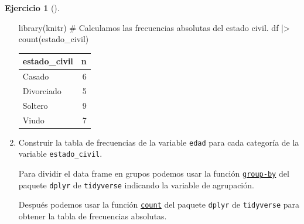 \documentclass[
  spanish,
  a4paper,
]{scrreport}
\newenvironment{Shaded}{\begin{snugshade}}{\end{snugshade}}
\newcommand{\CommentTok}[1]{\textcolor[rgb]{0.37,0.37,0.37}{#1}}
\newcommand{\FunctionTok}[1]{\textcolor[rgb]{0.28,0.35,0.67}{#1}}
\newcommand{\NormalTok}[1]{\textcolor[rgb]{0.00,0.23,0.31}{#1}}
\newcommand{\SpecialCharTok}[1]{\textcolor[rgb]{0.37,0.37,0.37}{#1}}
\theoremstyle{definition}
\newtheorem{exercise}{Ejercicio}[chapter]
\theoremstyle{remark}
\begin{document}
\begin{exercise}[]
\begin{enumerate}
\begin{tcolorbox}
\begin{Shaded}
\begin{Highlighting}[]
\FunctionTok{library}\NormalTok{(knitr)}
\CommentTok{\# Calculamos las frecuencias absolutas del estado civil.}
\NormalTok{df }\SpecialCharTok{|\textgreater{}} \FunctionTok{count}\NormalTok{(estado\_civil)}
\end{Highlighting}
\end{Shaded}

  \begin{longtable}[]{@{}lr@{}}
  \toprule\noalign{}
  estado\_civil & n \\
  \midrule\noalign{}
  \endhead
  \bottomrule\noalign{}
  \endlastfoot
  Casado & 6 \\
  Divorciado & 5 \\
  Soltero & 9 \\
  Viudo & 7 \\
  \end{longtable}

  \end{tcolorbox}
\item
  Construir la tabla de frecuencias de la variable \texttt{edad} para
  cada categoría de la variable \texttt{estado\_civil}.

  \begin{tcolorbox}[enhanced jigsaw, breakable, leftrule=.75mm, toptitle=1mm, rightrule=.15mm, opacitybacktitle=0.6, left=2mm, colframe=quarto-callout-tip-color-frame, titlerule=0mm, toprule=.15mm, opacityback=0, bottomtitle=1mm, coltitle=black, colbacktitle=quarto-callout-tip-color!10!white, title=\textcolor{quarto-callout-tip-color}{\faLightbulb}\hspace{0.5em}{Solución}, arc=.35mm, bottomrule=.15mm, colback=white]

  Para dividir el data frame en grupos podemos usar la función
  \href{https://aprendeconalf.es/manual-r/06-preprocesamiento.html\#res\%C3\%BAmenes-por-grupos}{\texttt{group-by}}
  del paquete \texttt{dplyr} de \texttt{tidyverse} indicando la variable
  de agrupación.

  Después podemos usar la función
  \href{https://aprendeconalf.es/manual-r/06-preprocesamiento.html\#conteo-del-n\%C3\%BAmero-de-observaciones}{\texttt{count}}
  del paquete \texttt{dplyr} de \texttt{tidyverse} para obtener la tabla
  de frecuencias absolutas.


\end{tcolorbox}
\end{enumerate}
\end{exercise}
\end{document}
